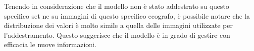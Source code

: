 Tenendo in considerazione che il modello non è stato addestrato su questo specifico set ne su
immagini di questo specifico ecografo, è possibile notare che la distribuzione dei valori è molto
simile a quella delle immagini utilizzate per l'addestramento. Questo suggerisce che il modello è
in grado di gestire con efficacia le nuove informazioni.



%

